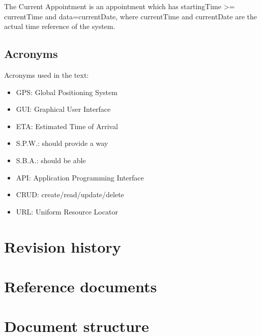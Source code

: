 \begin{definition}
The Current Appointment is an appointment which has startingTime >= currentTime and data=currentDate, where currentTime and  currentDate are the actual time reference of the system.
\end{definition}


\subsection{Acronyms}
Acronyms used in the text:
\begin{itemize}
\item GPS: Global Positioning System
\item GUI: Graphical User Interface
\item ETA: Estimated Time of Arrival
\item S.P.W.: should provide a way
\item S.B.A.: should be able 
\item API: Application Programming Interface
\item CRUD: create/read/update/delete
\item URL: Uniform Resource Locator
\end{itemize}


\section{Revision history}

\section{Reference documents}

\section{Document structure}

 
